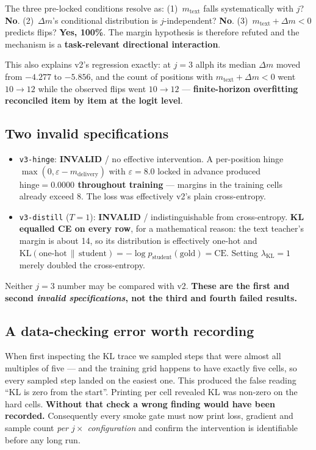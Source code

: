 \documentclass[11pt, a4paper]{article}
\newcommand{\INVALID}{\textcolor{orange!80!black}{\textbf{INVALID}}}
\newcommand{\dm}{\Delta m}
\newcommand{\mtext}{m_{\mathrm{text}}}
\begin{document}
The three pre-locked conditions resolve as: (1)~$\mtext$ falls systematically with $j$?
\textbf{No}. (2)~$\dm$'s conditional distribution is $j$-independent? \textbf{No}.
(3)~$\mtext + \dm < 0$ predicts flips? \textbf{Yes, 100\%}. The margin hypothesis is
therefore refuted and the mechanism is a \textbf{task-relevant directional interaction}.

This also explains v2's regression exactly: at $j{=}3$ allph its median $\dm$ moved from
$-4.277$ to $-5.856$, and the count of positions with $\mtext + \dm < 0$ went $10 \to 12$
while the observed flips went $10 \to 12$ --- \textbf{finite-horizon overfitting reconciled
item by item at the logit level}.

\subsection{Two invalid specifications}

\begin{itemize}
\item \texttt{v3-hinge}: \INVALID{} / no effective intervention. A per-position hinge
$\max(0, \varepsilon - m_{\mathrm{delivery}})$ with $\varepsilon = 8.0$ locked in advance
produced \textbf{$\text{hinge} = 0.0000$ throughout training} --- margins in the training
cells already exceed 8. The loss was effectively v2's plain cross-entropy.
\item \texttt{v3-distill} ($T{=}1$): \INVALID{} / indistinguishable from cross-entropy.
\textbf{KL equalled CE on every row}, for a mathematical reason: the text teacher's margin
is about 14, so its distribution is effectively one-hot and
$\mathrm{KL}(\text{one-hot} \,\|\, \text{student}) = -\log p_{\text{student}}(\text{gold})
= \mathrm{CE}$. Setting $\lambda_{\mathrm{KL}} = 1$ merely doubled the cross-entropy.
\end{itemize}

Neither $j{=}3$ number may be compared with v2. \textbf{These are the first and second
\emph{invalid specifications}, not the third and fourth failed results.}

\subsection{A data-checking error worth recording}

When first inspecting the KL trace we sampled steps that were almost all multiples of
five --- and the training grid happens to have exactly five cells, so every sampled step
landed on the easiest one. This produced the false reading ``KL is zero from the start''.
Printing per cell revealed KL was non-zero on the hard cells. \textbf{Without that check a
wrong finding would have been recorded.} Consequently every smoke gate must now print
loss, gradient and sample count \emph{per $j \times$ configuration} and confirm the
intervention is identifiable before any long run.
\end{document}
